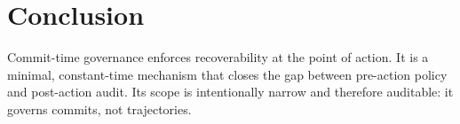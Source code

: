 \documentclass[letterpaper,10pt,conference]{ieeeconf}
\begin{document}
\section{Conclusion}
Commit-time governance enforces recoverability at the point of action. It is a minimal, constant-time mechanism that closes the gap between pre-action policy and post-action audit. Its scope is intentionally narrow and therefore auditable: it governs commits, not trajectories.
\end{document}
